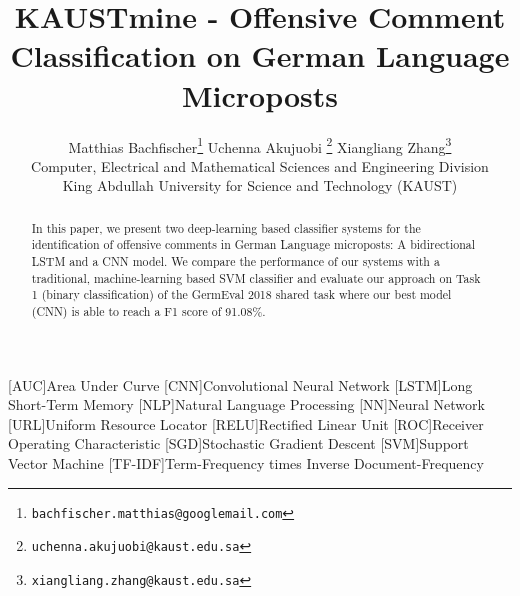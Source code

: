 \documentclass[11pt]{article}
\title{KAUSTmine - Offensive Comment Classification on German Language Microposts}
\author{Matthias Bachfischer\thanks{\tt \space bachfischer.matthias@googlemail.com} \qquad Uchenna Akujuobi \thanks{\tt  \space uchenna.akujuobi@kaust.edu.sa} \qquad Xiangliang Zhang\thanks{\tt  \space xiangliang.zhang@kaust.edu.sa} \\
   Computer, Electrical and Mathematical Sciences and Engineering Division \\
     King Abdullah University for Science and Technology (KAUST) \\
}
\date{}
\begin{document}
\begin{acronym}[\hspace{1.8cm}]
[AUC]{Area Under Curve}
[CNN]{Convolutional Neural Network}
[LSTM]{Long Short-Term Memory}
 [NLP]{Natural Language Processing}
 [NN]{Neural Network}
 [URL]{Uniform Resource Locator}
 [RELU]{Rectified Linear Unit}
 [ROC]{Receiver Operating Characteristic}
 [SGD]{Stochastic Gradient Descent}
[SVM]{Support Vector Machine}
[TF-IDF]{Term-Frequency times Inverse Document-Frequency}

\end{acronym}

\maketitle
\begin{abstract}
In this paper, we present two deep-learning based classifier systems for the identification of offensive comments in German Language microposts: A bidirectional LSTM and a CNN model. We compare the performance of our systems with a traditional, machine-learning based SVM classifier and evaluate our approach on Task 1 (binary classification) of the GermEval 2018 shared task where our best model (CNN) is able to reach a F1 score of 91.08\%.
\end{abstract}

\nocite{RN65}
\end{document}
